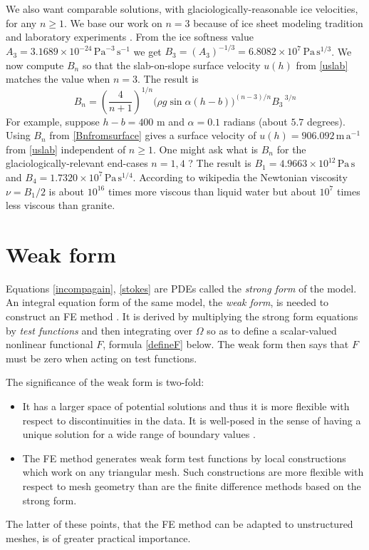 \documentclass[letterpaper,final,12pt,reqno]{amsart}
\begin{document}
We also want comparable solutions, with glaciologically-reasonable ice velocities, for any $n\ge 1$.  We base our work on $n=3$ because of ice sheet modeling tradition and laboratory experiments \cite{GreveBlatter2009}.  From the ice softness value $A_3 = 3.1689 \times 10^{-24} \,\text{Pa}^{-3}\,\text{s}^{-1}$ we get $B_3 = (A_3)^{-1/3} = 6.8082\times 10^7\,\text{Pa}\,\text{s}^{1/3}$.  We now compute $B_n$ so that the slab-on-slope surface velocity $u(h)$ from \eqref{uslab} matches the value when $n=3$.  The result is
\begin{equation}
B_n = \left(\frac{4}{n+1}\right)^{1/n} \Big(\rho g \sin\alpha (h-b)\Big)^{(n-3)/n} {B_3\,}^{3/n}  \label{Bnfromsurface}
\end{equation}
For example, suppose $h-b=400$ m and $\alpha=0.1$ radians (about $5.7$ degrees).  Using $B_n$ from \eqref{Bnfromsurface} gives a surface velocity of $u(h)=906.092 \,\text{m}\,\text{a}^{-1}$ from \eqref{uslab} independent of $n\ge 1$.  One might ask what is $B_n$ for the glaciologically-relevant end-cases $n=1,4$ \cite{GoldsbyKohlstedt2001}?  The result is $B_1=4.9663\times 10^{12}\,\text{Pa}\,\text{s}$ and $B_4=1.7320\times 10^{7}\,\text{Pa}\,\text{s}^{1/4}$.  According to wikipedia the Newtonian viscosity $\nu=B_1/2$ is about $10^{16}$ times more viscous than liquid water but about $10^7$ times less viscous than granite.


\section{Weak form} \label{sec:weakform}

Equations \eqref{incompagain}, \eqref{stokes} are PDEs called the \emph{strong form} of the model.  An integral equation form of the same model, the \emph{weak form}, is needed to construct an FE method \cite{Elmanetal2014}.  It is derived by multiplying the strong form equations by \emph{test functions} and then integrating over $\Omega$ so as to define a scalar-valued nonlinear functional $F$, formula \eqref{defineF} below.  The weak form then says that $F$ must be zero when acting on test functions.

The significance of the weak form is two-fold:
\begin{itemize}
\item It has a larger space of potential solutions and thus it is more flexible with respect to discontinuities in the data.  It is well-posed in the sense of having a unique solution  for a wide range of boundary values \cite{JouvetRappaz2011}.
\item The FE method generates weak form test functions by local constructions which work on any triangular mesh.  Such constructions are more flexible with respect to mesh geometry than are the finite difference methods based on the strong form.
\end{itemize}
The latter of these points, that the FE method can be adapted to unstructured meshes, is of greater practical importance.
\end{document}
